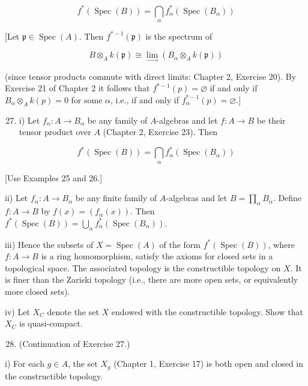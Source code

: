 \documentclass{standalone}
\theoremstyle{definition}
\theoremstyle{remark}
\begin{document}
\[
f^{*}(\operatorname{Spec}(B))=\bigcap_{\alpha} f_{\alpha}^{*}\left(\operatorname{Spec}\left(B_{\alpha}\right)\right)
\]

[Let $\mathfrak{p} \in \operatorname{Spec}(A)$. Then $f^{*-1}(\mathfrak{p})$ is the spectrum of

\[
B \otimes_{A} k(\mathfrak{p}) \cong \lim _{\longrightarrow}\left(B_{\alpha} \otimes_{A} k(\mathfrak{p})\right)
\]

(since tensor products commute with direct limits: Chapter 2, Exercise 20). By Exercise 21 of Chapter 2 it follows that $f^{*-1}(p)=\varnothing$ if and only if $B_{\alpha} \otimes_{A} k(p)=0$ for some $\alpha$, i.e., if and only if $f_{\alpha}^{*-1}(p)=\varnothing$.]

\begin{enumerate}
  \setcounter{enumi}{26}
  \item i) Let $f_{\alpha}: A \rightarrow B_{\alpha}$ be any family of $A$-algebras and let $f: A \rightarrow B$ be their tensor product over $A$ (Chapter 2, Exercise 23). Then
\end{enumerate}

\[
f^{*}(\operatorname{Spec}(B))=\bigcap_{\alpha} f_{\alpha}^{*}\left(\operatorname{Spec}\left(B_{\alpha}\right)\right)
\]

[Use Examples 25 and 26.]

ii) Let $f_{\alpha}: A \rightarrow B_{\alpha}$ be any finite family of $A$-algebras and let $B=\prod_{\alpha} B_{\alpha}$. Define $f: A \rightarrow B$ by $f(x)=\left(f_{\alpha}(x)\right)$. Then $f^{*}(\operatorname{Spec}(B))=\bigcup_{\alpha} f_{\alpha}^{*}\left(\operatorname{Spec}\left(B_{\alpha}\right)\right)$.

iii) Hence the subsets of $X=\operatorname{Spec}(A)$ of the form $f^{*}(\operatorname{Spec}(B))$, where $f: A \rightarrow B$ is a ring homomorphism, satisfy the axioms for closed sets in a topological space. The associated topology is the constructible topology on $X$. It is finer than the Zariski topology (i.e., there are more open sets, or equivalently more closed sets).

iv) Let $X_{C}$ denote the set $X$ endowed with the constructible topology. Show that $X_{C}$ is quasi-compact.

\begin{enumerate}
  \setcounter{enumi}{27}
  \item (Continuation of Exercise 27.)
\end{enumerate}

i) For each $g \in A$, the set $X_{g}$ (Chapter 1, Exercise 17) is both open and closed in the constructible topology.
\end{document}
